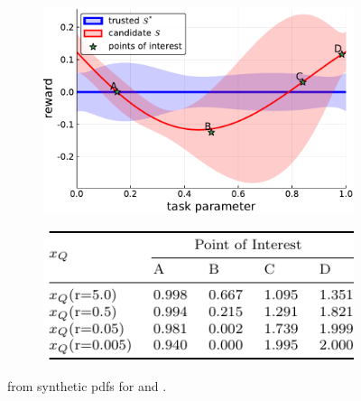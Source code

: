 \begin{figure}[tbp]
    \centering
    \begin{subfigure}[c]{0.5\linewidth}
        \centering
        \includegraphics[width=0.99\linewidth]{Figures/p1.pdf}
        \vfill
    \end{subfigure}%
    \hfill
    \begin{subfigure}[t]{0.5\linewidth}
        \centering
        \includegraphics[width=0.95\linewidth]{Figures/p1_table.pdf}
    \end{subfigure} 
    \caption{\xQ{} from synthetic \pri{} pdfs for \solvetrust{} and \solvecand{}.}
    \label{fig:sq_thry1}
\end{figure}

